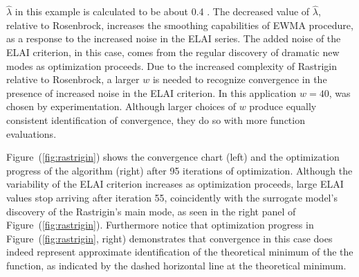 \documentclass[12pt]{article}
\def \rastLamb {
        0.4
}
\begin{document}
%
$\hat\lambda$ in this example is calculated to be about \rastLamb.
%
The decreased value of $\hat\lambda$, relative to Rosenbrock, increases the smoothing capabilities of EWMA procedure, as a response to the increased noise in the ELAI series. %
%
The added noise of the ELAI criterion, in this case, comes from the regular discovery of dramatic new modes as optimization proceeds.
%
Due to the increased complexity of Rastrigin relative to Rosenbrock, a larger $w$ is needed to recognize convergence in the presence of increased noise in the ELAI criterion. 
%
In this application $w=40$, was chosen by experimentation.
%
Although larger choices of $w$ produce equally consistent identification of convergence, they do so with more function evaluations.

%
%

%
Figure~(\ref{fig:rastrigin}) shows the convergence chart (left) and the optimization progress of the algorithm (right) after 95 iterations of optimization.
%
Although the variability of the ELAI criterion increases as optimization proceeds, large ELAI values stop arriving after iteration 55, coincidently with the surrogate model's discovery of the Rastrigin's main mode, as seen in the right panel of Figure~(\ref{fig:rastrigin}).
%
Furthermore notice that optimization progress in Figure~(\ref{fig:rastrigin}, right) demonstrates that convergence in this case does indeed represent approximate identification of the theoretical minimum of the the function, as indicated by the dashed horizontal line at the theoretical minimum. 


%
%
%

\end{document}
